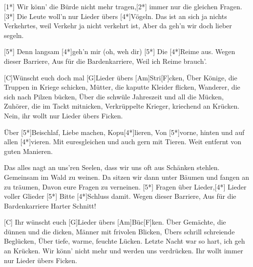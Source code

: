 

\hfill{}

\begin{guitar}
	[1*] Wir könn' die Bürde nicht mehr tragen,[2*] immer nur die gleichen Fragen.
	[3*] Die Leute woll'n nur Lieder übers [4*]Vögeln.
	Das ist an sich ja nichts Verkehrtes, weil Verkehr ja nicht verkehrt ist,
	Aber da geh'n wir doch lieber segeln.
	
	[5*] Denn langsam [4*]geh'n mir (oh, weh dir)
	[5*] Die [4*]Reime aus.
	Wegen dieser Barriere, Aus für die Bardenkarriere,
	Weil ich Reime brauch'.
	
	\begin{highlightbar}
		[C]Wünscht euch doch mal [G]Lieder übers [Am]Stri[F]cken,
		Über Könige, die Truppen in Kriege schicken,
		Mütter, die kaputte Kleider flicken,
		Wanderer, die sich nach Pilzen bücken,
		Über die schwüle Jahreszeit und all die Mücken,
		Zuhörer, die im Tackt mitnicken,
		Verkrüppelte Krieger, kriechend an Krücken.
		Nein, ihr wollt nur Lieder übers Ficken.
	\end{highlightbar}
	
	\songsection{Post-Refrain 1}
	Über [5*]Beischlaf, Liebe machen, Kopu[4*]lieren,
	Von [5*]vorne, hinten und auf allen [4*]vieren.
	Mit euresgleichen und auch gern mit Tieren.
	Weit entfernt von guten Manieren.
	
	\songsection{Strophe 2}
	Das alles nagt an uns'ren Seelen, dass wir uns oft aus Schänken stehlen.
	Gemeinsam im Wald zu weinen.
	Da sitzen wir dann unter Bäumen und fangen an zu träumen,
	Davon eure Fragen zu verneinen.
	\pagebreak
	\songsection{Bridge 2}
	[5*] Fragen über Lieder,[4*] Lieder voller Glieder
	[5*] Bitte [4*]Schluss damit.
	Wegen dieser Barriere, Aus für die Bardenkarriere
	Harter Schnitt!
	
	\begin{highlightbar}
		\songsection{Refrain 2}
		[C] Ihr wünscht euch [G]Lieder übers [Am]Büc[F]ken.
		Über Gemächte, die dünnen und die dicken,
		Männer mit frivolen Blicken,
		Übers schrill schreiende Beglücken,
		Über tiefe, warme, feuchte Lücken.
		Letzte Nacht war so hart, ich geh an Krücken.
		Wir könn' nicht mehr und werden uns verdrücken.
		Ihr wollt immer nur Lieder übers Ficken.
	\end{highlightbar}
	

\end{guitar}
